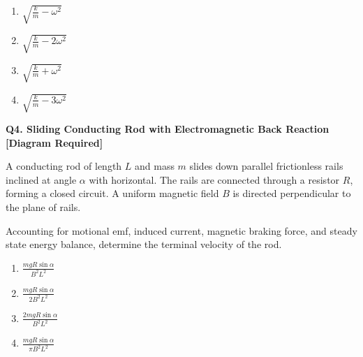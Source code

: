 \documentclass[12pt]{article}
\begin{document}
\begin{enumerate}
\item[(A)] $\sqrt{\frac{k}{m}-\omega^2}$
\item[(B)] $\sqrt{\frac{k}{m}-2\omega^2}$
\item[(C)] $\sqrt{\frac{k}{m}+\omega^2}$
\item[(D)] $\sqrt{\frac{k}{m}-3\omega^2}$
\end{enumerate}


\textbf{Q4. Sliding Conducting Rod with Electromagnetic Back Reaction [Diagram Required]}

A conducting rod of length $L$ and mass $m$ slides down parallel frictionless rails inclined at angle $\alpha$ with horizontal. The rails are connected through a resistor $R$, forming a closed circuit. A uniform magnetic field $B$ is directed perpendicular to the plane of rails.  

Accounting for motional emf, induced current, magnetic braking force, and steady state energy balance, determine the terminal velocity of the rod.

\begin{center}
\end{center}

\begin{enumerate}
\item[(A)] $\frac{mgR\sin\alpha}{B^2L^2}$
\item[(B)] $\frac{mgR\sin\alpha}{2B^2L^2}$
\item[(C)] $\frac{2mgR\sin\alpha}{B^2L^2}$
\item[(D)] $\frac{mgR\sin\alpha}{\pi B^2L^2}$
\end{enumerate}
\end{document}
